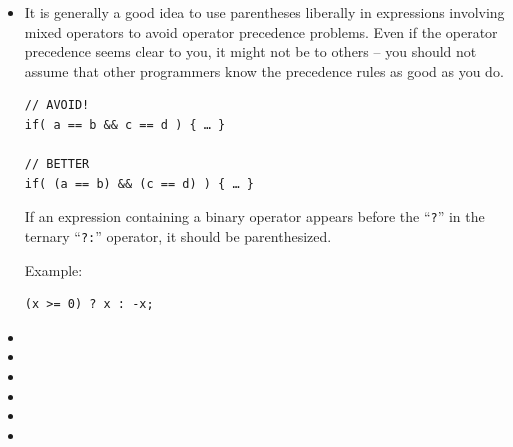 \begin{itemize}
{should be written as 
\begin{lstlisting}
a = b + c;
d = a + r;}
\end{lstlisting}}

\item{It is generally a good idea to use parentheses liberally in expressions involving mixed operators to avoid operator precedence problems. Even if the operator precedence seems clear to you, it might not be to others – you should not assume that other programmers know the precedence rules as good as you do.
\begin{lstlisting}
// AVOID!
if( a == b && c == d ) { … }

// BETTER
if( (a == b) && (c == d) ) { … }
\end{lstlisting}

If an expression containing a binary operator appears before the “\verb#?#” in the ternary “\verb#?:#” operator, it should be parenthesized.
 
Example:
\begin{lstlisting}
(x >= 0) ? x : -x;
\end{lstlisting}
}

\item{}

\item{}

\item{}

\item{}

\item{}

\item{}
\end{itemize}

\begin{lstlisting}
\end{lstlisting}

\begin{lstlisting}
\end{lstlisting}

\begin{lstlisting}
\end{lstlisting}

